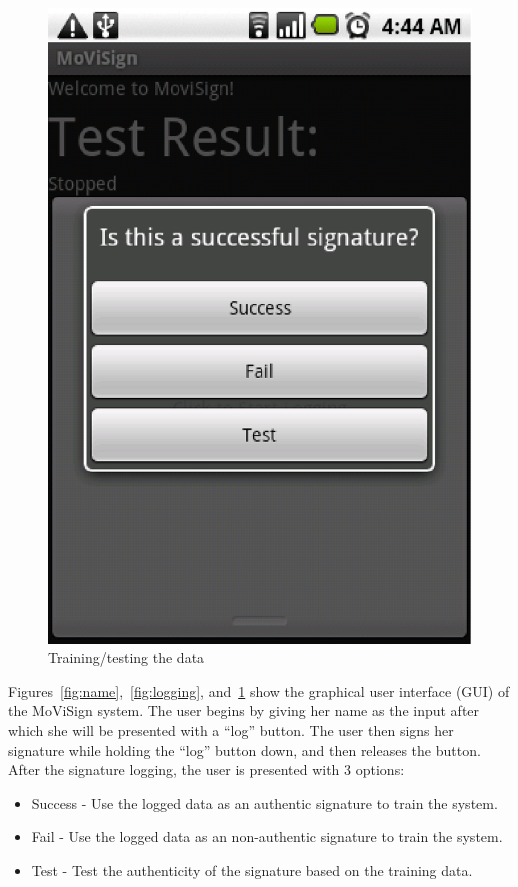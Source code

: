 \documentclass[12pt]{article}
\begin{document}
\begin{figure}[ht]
\begin{minipage}[b]{0.3\textwidth}
\includegraphics[width=\textwidth]{checkbox}
\caption{Training/testing the data}
\label{fig:checkbox}
\end{minipage}
\end{figure}

Figures~\ref{fig:name},~\ref{fig:logging}, and~\ref{fig:checkbox} show the graphical user interface (GUI) of the MoViSign system. The user begins by giving her name as the input after which she will be presented with a ``log'' button. The user then signs her signature while holding the ``log'' button down, and then releases the button. After the signature logging, the user is presented with 3 options:
\begin{itemize}
\item Success - Use the logged data as an authentic signature to train the system.
\item Fail - Use the logged data as an non-authentic signature to train the system.
\item Test - Test the authenticity of the signature based on the training data.
\end{itemize}
\end{document}
